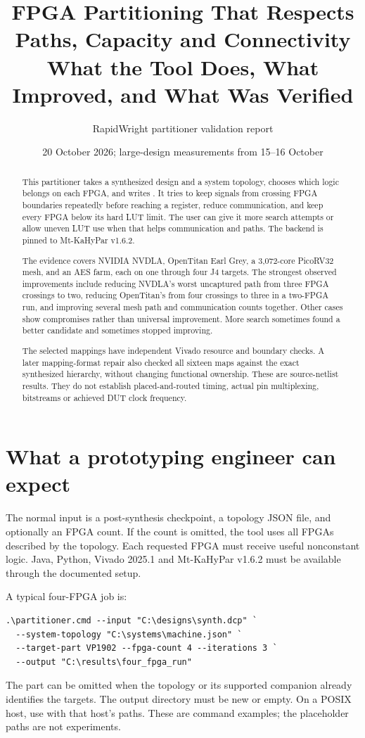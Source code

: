 \documentclass[11pt]{article}
\title{FPGA Partitioning That Respects Paths, Capacity and Connectivity\\What the Tool Does, What Improved, and What Was Verified}
\author{RapidWright partitioner validation report}
\date{20 October 2026; large-design measurements from 15--16 October}
\newcommand{\code}[1]{\texttt{\detokenize{#1}}}
\begin{document}
\maketitle

\begin{abstract}
This partitioner takes a synthesized design and a system topology, chooses which logic belongs on each FPGA, and writes \code{mapping.txt}. It tries to keep signals from crossing FPGA boundaries repeatedly before reaching a register, reduce communication, and keep every FPGA below its hard LUT limit. The user can give it more search attempts or allow uneven LUT use when that helps communication and paths. The backend is pinned to Mt-KaHyPar v1.6.2.

The evidence covers NVIDIA NVDLA, OpenTitan Earl Grey, a 3,072-core PicoRV32 mesh, and an AES farm, each on one through four J4 targets. The strongest observed improvements include reducing NVDLA's worst uncaptured path from three FPGA crossings to two, reducing OpenTitan's from four crossings to three in a two-FPGA run, and improving several mesh path and communication counts together. Other cases show compromises rather than universal improvement. More search sometimes found a better candidate and sometimes stopped improving.

The selected mappings have independent Vivado resource and boundary checks. A later mapping-format repair also checked all sixteen maps against the exact synthesized hierarchy, without changing functional ownership. These are source-netlist results. They do not establish placed-and-routed timing, actual pin multiplexing, bitstreams or achieved DUT clock frequency.
\end{abstract}

\tableofcontents
\clearpage

\section{What a prototyping engineer can expect}

The normal input is a post-synthesis checkpoint, a topology JSON file, and optionally an FPGA count. If the count is omitted, the tool uses all FPGAs described by the topology. Each requested FPGA must receive useful nonconstant logic. Java, Python, Vivado 2025.1 and Mt-KaHyPar v1.6.2 must be available through the documented setup.

A typical four-FPGA job is:
\begin{Verbatim}[fontsize=\small]
.\partitioner.cmd --input "C:\designs\synth.dcp" `
  --system-topology "C:\systems\machine.json" `
  --target-part VP1902 --fpga-count 4 --iterations 3 `
  --output "C:\results\four_fpga_run"
\end{Verbatim}
The part can be omitted when the topology or its supported companion already identifies the targets. The output directory must be new or empty. On a POSIX host, use \code{./partitioner} with that host's paths. These are command examples; the placeholder paths are not experiments.
\end{document}
